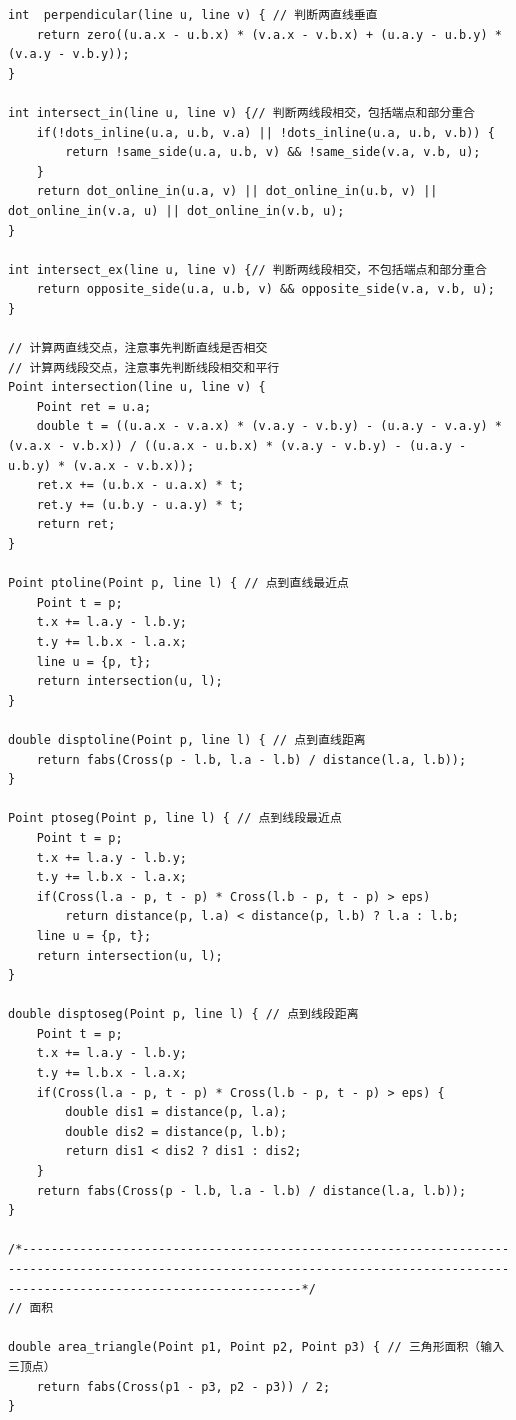 \documentclass[twoside]{article}
\begin{document}
\begin{lstlisting}
int  perpendicular(line u, line v) { // 判断两直线垂直
    return zero((u.a.x - u.b.x) * (v.a.x - v.b.x) + (u.a.y - u.b.y) * (v.a.y - v.b.y));
}

int intersect_in(line u, line v) {// 判断两线段相交，包括端点和部分重合
    if(!dots_inline(u.a, u.b, v.a) || !dots_inline(u.a, u.b, v.b)) {
        return !same_side(u.a, u.b, v) && !same_side(v.a, v.b, u);
    }
    return dot_online_in(u.a, v) || dot_online_in(u.b, v) || dot_online_in(v.a, u) || dot_online_in(v.b, u);
}

int intersect_ex(line u, line v) {// 判断两线段相交，不包括端点和部分重合
    return opposite_side(u.a, u.b, v) && opposite_side(v.a, v.b, u);
}  

// 计算两直线交点，注意事先判断直线是否相交
// 计算两线段交点，注意事先判断线段相交和平行
Point intersection(line u, line v) {
    Point ret = u.a;
    double t = ((u.a.x - v.a.x) * (v.a.y - v.b.y) - (u.a.y - v.a.y) * (v.a.x - v.b.x)) / ((u.a.x - u.b.x) * (v.a.y - v.b.y) - (u.a.y - u.b.y) * (v.a.x - v.b.x));
    ret.x += (u.b.x - u.a.x) * t;
    ret.y += (u.b.y - u.a.y) * t;
    return ret;
}

Point ptoline(Point p, line l) { // 点到直线最近点
    Point t = p;
    t.x += l.a.y - l.b.y;
    t.y += l.b.x - l.a.x;
    line u = {p, t};
    return intersection(u, l);
}

double disptoline(Point p, line l) { // 点到直线距离
    return fabs(Cross(p - l.b, l.a - l.b) / distance(l.a, l.b));
}

Point ptoseg(Point p, line l) { // 点到线段最近点
    Point t = p;
    t.x += l.a.y - l.b.y;
    t.y += l.b.x - l.a.x;
    if(Cross(l.a - p, t - p) * Cross(l.b - p, t - p) > eps) 
        return distance(p, l.a) < distance(p, l.b) ? l.a : l.b;
    line u = {p, t};
    return intersection(u, l);
}

double disptoseg(Point p, line l) { // 点到线段距离
    Point t = p;
    t.x += l.a.y - l.b.y;
    t.y += l.b.x - l.a.x;
    if(Cross(l.a - p, t - p) * Cross(l.b - p, t - p) > eps) {
        double dis1 = distance(p, l.a);
        double dis2 = distance(p, l.b);
        return dis1 < dis2 ? dis1 : dis2;
    }
    return fabs(Cross(p - l.b, l.a - l.b) / distance(l.a, l.b));
}

/*-----------------------------------------------------------------------------------------------------------------------------------------------------------------------------------*/
// 面积

double area_triangle(Point p1, Point p2, Point p3) { // 三角形面积（输入三顶点）
    return fabs(Cross(p1 - p3, p2 - p3)) / 2;
}


\end{lstlisting}
\end{document}
